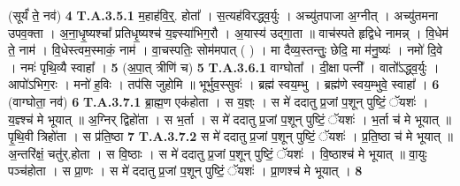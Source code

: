 \documentclass[17pt]{extarticle}
\begin{document}
                  \newline
                                                        (सूर्यं॑ ते॒ नव॑) \textbf{4} \newline \newline
                                \textbf{ T.A.3.5.1} \newline
                  म॒हाह॑वि॒र्॒. होता᳚ । स॒त्यह॑विरद्ध्व॒र्युः । अच्यु॑तपाजा अ॒ग्नीत् । अच्यु॑तमना उपव॒क्ता । अ॒ना॒धृ॒ष्यश्चा᳚ प्रतिधृ॒ष्यश्च॑ य॒ज्ञ्स्या॑भिग॒रौ । अ॒यास्य॑ उद्गा॒ता ॥ वाच॑स्पते हृद्विधे नामन्न् । वि॒धेम॑ ते॒ नाम॑ ।  वि॒धेस्त्वम॒स्माकं॒ नाम॑ । वा॒चस्पतिः॒ सोम॑मपात् ( ) । मा दैव्य॒स्तन्तुः॒ छेदि॒ मा म॑नु॒ष्यः॑ । नमो॑ दि॒वे । नमः॑ पृथि॒व्यै स्वाहा᳚ । \textbf{ 5} \newline
                  \newline
                                                        (अ॒पा॒त् त्रीणि॑ च) \textbf{5} \newline \newline
                                \textbf{ T.A.3.6.1} \newline
                  वाग्घोता᳚ । दी॒क्षा पत्नी᳚ । वातो᳚ऽद्ध्व॒र्युः । आपो॑ऽभिग॒रः । मनो॑ ह॒विः । तप॑सि जुहोमि ॥  भूर्भुव॒स्सुवः॑ । ब्रह्म॑ स्वय॒म्भु ।  ब्रह्म॑णे स्वय॒म्भुवे॒ स्वाहा᳚ । \textbf{ 6} \newline
                  \newline
                                                        (वाग्घोता॒ नव॑) \textbf{6} \newline \newline
                                \textbf{ T.A.3.7.1} \newline
                  ब्रा॒ह्म॒ण एक॑होता । स य॒ज्ञ्ः । स मे॑ ददातु प्र॒जां प॒शून् पुष्टिं॒ ॅयशः॑ । य॒ज्ञ्श्च॑ मे भूयात् ॥ अ॒ग्निर् द्विहो॑ता । स भ॒र्ता । स मे॑ ददातु प्र॒जां प॒शून् पुष्टिं॒ ॅयशः॑ । भ॒र्ता च॑ मे भूयात् ॥  पृ॒थि॒वी त्रिहो॑ता । स प्र॑ति॒ष्ठा \textbf{ 7} \newline
                  \newline
                                                                  \textbf{ T.A.3.7.2} \newline
                  स मे॑ ददातु प्र॒जां प॒शून् पुष्टिं॒ ॅयशः॑ । प्र॒ति॒ष्ठा च॑ मे भूयात् ॥ अ॒न्तरि॑क्षं॒ चतु॑र्.होता । स वि॒ष्ठाः । स मे॑ ददातु प्र॒जां प॒शून् पुष्टिं॒ ॅयशः॑ । वि॒ष्ठाश्च॑ मे भूयात् ॥  वा॒युः पञ्च॑होता । स प्रा॒णः ।  स मे॑ ददातु प्र॒जां प॒शून् पुष्टिं॒ ॅयशः॑ । प्रा॒णश्च॑ मे भूयात् । \textbf{ 8} \newline
                  \newline
\end{document}
